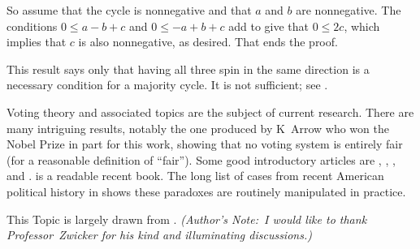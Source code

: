So assume that the cycle is nonnegative and
that $a$ and $b$ are nonnegative.
The conditions $0\leq a-b+c$ and $0\leq -a+b+c$ add to give
that $0\leq 2c$, which implies that $c$ is also nonnegative, as desired.
That ends the proof.

This result says only that having all three spin in the same direction is a 
necessary condition for a majority cycle.
It is not sufficient; see
.

Voting theory and associated topics are the subject of current research.
There are many intriguing results, notably 
the one produced by K~Arrow \cite{Arrow} who won the Nobel Prize in part for
this work, showing that no voting system is entirely fair
(for a reasonable definition of ``fair'').
Some good introductory articles are \cite{Gardner70}, 
\cite{Gardner74}, \cite{Gardner80}, and \cite{NeimiRiker}.
\cite{Taylor} is a readable recent book.
The long list of cases from recent American political history in 
\cite{GamingVote} shows these paradoxes are 
routinely manipulated in practice.
 
This Topic is largely drawn from \cite{Zwicker}.
\emph{(Author's Note:~I would like to thank Professor~Zwicker 
for his kind and illuminating discussions.)}

